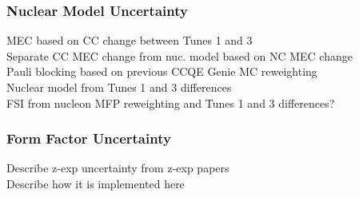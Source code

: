   \subsubsection{Nuclear Model Uncertainty}\label{sec:modeluncertainty}
    MEC based on CC change between Tunes 1 and 3 \\
    Separate CC MEC change from nuc. model based on NC MEC change \\
    Pauli blocking based on previous CCQE Genie MC reweighting \\
    Nuclear model from Tunes 1 and 3 differences \\
    FSI from nucleon MFP reweighting and Tunes 1 and 3 differences?
  \subsubsection{Form Factor Uncertainty}\label{sec:ffuncertainty}
    Describe z-exp uncertainty from z-exp papers \\
    Describe how it is implemented here


